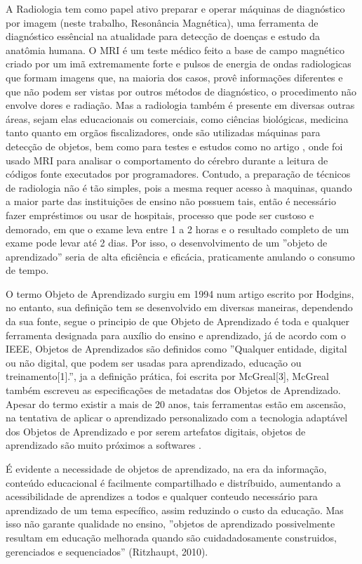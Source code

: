 \documentclass[12pt,openright,oneside,a4paper,english,french,spanish,brazil]{unifil}
\begin{document}
A Radiologia tem como papel ativo preparar e operar máquinas de diagnóstico por imagem (neste trabalho, Resonância Magnética), uma ferramenta de diagnóstico essêncial na atualidade para detecção de doenças e estudo da anatômia humana. O MRI é um teste médico feito a base de campo magnético criado por um imã extremamente forte e pulsos de energia de ondas radiologicas que formam imagens que, na maioria dos casos, provê informações diferentes e que não podem ser vistas por outros métodos de diagnóstico, o procedimento não envolve dores e radiação. Mas a radiologia também é presente em diversas outras áreas, sejam elas educacionais ou comerciais, como ciências biológicas, medicina tanto quanto em orgãos fiscalizadores, onde são utilizadas máquinas para detecção de objetos, bem como para testes e estudos como no artigo \citeyear{Siegmund:2014}, onde foi usado MRI para analisar o comportamento do cérebro durante a leitura de códigos fonte executados por programadores. Contudo, a preparação de técnicos de radiologia não é tão simples, pois a mesma requer acesso à maquinas, quando a maior parte das instituições de ensino não possuem tais, então é necessário fazer empréstimos ou usar de hospitais, processo que pode ser custoso e demorado, em que o exame leva entre 1 a 2 horas e o resultado completo de um exame pode levar até 2 dias. Por isso, o desenvolvimento de um ''objeto de aprendizado'' seria de alta eficiência e eficácia, praticamente anulando o consumo de tempo.

O termo Objeto de Aprendizado surgiu em 1994  num artigo escrito por Hodgins, no entanto, sua definição tem se desenvolvido em diversas maneiras, dependendo da sua fonte, segue o principio de que Objeto de Aprendizado é toda e qualquer ferramenta designada para auxílio do ensino e aprendizado, já de acordo com o IEEE, Objetos de Aprendizados são definidos como ''Qualquer entidade, digital ou não digital, que podem ser usadas para aprendizado, educação ou treinamento[1].'', ja a definição prática, foi escrita por McGreal[3], McGreal também escreveu as especificações de metadatas dos Objetos de Aprendizado. Apesar do termo existir a mais de 20 anos, tais ferramentas estão em ascensão, na tentativa de aplicar o aprendizado personalizado com a tecnologia adaptável dos Objetos de Aprendizado e por serem artefatos digitais, objetos de aprendizado são muito próximos a softwares \citeyear{Braga:2012}.
	
	É evidente a necessidade de objetos de aprendizado, na era da informação, conteúdo educacional é facilmente compartilhado e distríbuido, aumentando a acessibilidade de aprendizes a todos e qualquer conteudo necessário para aprendizado de um tema específico, assim reduzindo o custo da educação. Mas isso não garante qualidade no ensino, ''objetos de aprendizado possivelmente resultam em educação melhorada quando são cuidadadosamente construidos, gerenciados e sequenciados'' (Ritzhaupt, 2010).
	
\end{document}
